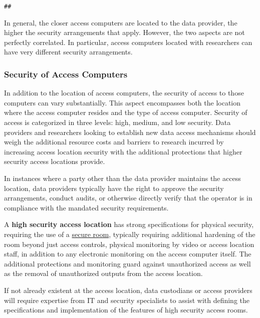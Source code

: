 \begin{verbatim}
## 
\end{verbatim}

In general, the closer access computers are located to the data provider, the higher the security arrangements that apply. However, the two aspects are not perfectly correlated. In particular, access computers located with researchers can have very different security arrangements.

\hypertarget{security-of-access-computers}{%
\subsubsection{Security of Access Computers}\label{security-of-access-computers}}

In addition to the location of access computers, the security of access to those computers can vary substantially. This aspect encompasses both the location where the access computer resides and the type of access computer. Security of access is categorized in three levels: high, medium, and low security. Data providers and researchers looking to establish new data access mechanisms should weigh the additional resource costs and barriers to research incurred by increasing access location security with the additional protections that higher security access locations provide.

In instances where a party other than the data provider maintains the access location, data providers typically have the right to approve the security arrangements, conduct audits, or otherwise directly verify that the operator is in compliance with the mandated security requirements.

A \textbf{high security access location} has strong specifications for physical security, requiring the use of a \protect\hyperlink{secure-rooms}{secure room}, typically requiring additional hardening of the room beyond just access controls, physical monitoring by video or access location staff, in addition to any electronic monitoring on the access computer itself. The additional protections and monitoring guard against unauthorized access as well as the removal of unauthorized outputs from the access location.

If not already existent at the access location, data custodians or access providers will require expertise from IT and security specialists to assist with defining the specifications and implementation of the features of high security access rooms.

